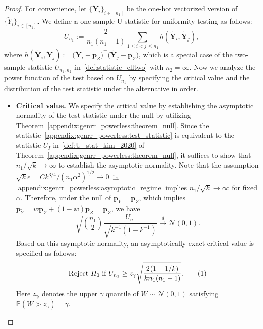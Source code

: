 \documentclass[twoside,11pt]{article}
\newcommand\numberthis{\addtocounter{equation}{1}\tag{\theequation}}
\newcommand{\rvTwo}{Y}
\newcommand{\rvThree}{Z}
\newcommand{\vectorize}[1]{\mathbf{#1}}
\newcommand{\mP}{\mathbb{P}} %
\newcommand{\sampleIndexOne}{i}
\newcommand{\sampleIndexTwo}{j}
\newcommand{\alphabetSize}{k} %
\newcommand{\sampleSize}{n}
\newcommand{\probVec}{\mathbf{p}} %
\newcommand{\privacyParameter}{\alpha} %
\begin{document}
\begin{appendix}
\begin{proof}
		For convenience, let $\{\tilde{\vectorize{\rvTwo}}_i\}_{i\in [\sampleSize_1]}$ be the one-hot vectorized version of $\{\tilde{\rvTwo}_i\}_{i\in [\sampleSize_1]}$.
		We define a one-sample U-statistic for uniformity testing as follows:
		\begin{equation}\label{appendix:genrr_powerless:test_statistic}
			U_{\sampleSize_1}
			:=	
			\frac{2}{\sampleSize_1(\sampleSize_1-1)}
			\sum_{1 \leq \sampleIndexOne < \sampleIndexTwo \leq \sampleSize_1}
			h(
			\tilde{\vectorize{\rvTwo}}_\sampleIndexOne, \tilde{\vectorize{\rvTwo}}_\sampleIndexTwo
			),
		\end{equation}
		where
		$
		h(
		\tilde{\vectorize{\rvTwo}}_\sampleIndexOne, \tilde{\vectorize{\rvTwo}}_\sampleIndexTwo
		):=
		\bigl(
		\tilde{\vectorize{\rvTwo}}_\sampleIndexOne
		- 
		\probVec_{\rvThree}
		\bigr)^\top
		\bigl(
		\tilde{\vectorize{\rvTwo}}_\sampleIndexTwo
		- 
		\probVec_{\rvThree}
		\bigr)$,
		which is a special case of the two-sample statistic $U_{\sampleSize_1, \sampleSize_2}$ in~\eqref{def:statistic_elltwo} with $\sampleSize_2 = \infty$. Now we analyze the power function of the test based on $U_{\sampleSize_1}$ by specifying the critical value and the distribution of the test statistic under the alternative in order.
		\begin{itemize}
		\item \textbf{Critical value.}
		We  specify the critical value by establishing the asymptotic normality of the test statistic under the null by utilizing Theorem~\ref{appendix:genrr_powerless:theorem_null}.
		Since the statistic~\eqref{appendix:genrr_powerless:test_statistic} is equivalent to the statistic $U_I$ in~\eqref{def:U_stat_kim_2020} of Theorem~\ref{appendix:genrr_powerless:theorem_null}, it suffices to show that $\sampleSize_1 / \sqrt{\alphabetSize} \to \infty$ to establish the asymptotic normality.
		Note that the assumption	$\sqrt{\alphabetSize} \epsilon = C
		\alphabetSize^{3/4}
		/
		(\sampleSize_1 \privacyParameter^2)^{1/2} \to 0$~in \eqref{appendix:genrr_powerless:asymptotic_regime} implies $\sampleSize_1 / \sqrt{\alphabetSize} \to \infty$ for fixed $\privacyParameter$. 
		Therefore, under the null of $\probVec_\rvTwo =\probVec_\rvThree$, which implies  $
		\probVec_{\tilde{\rvTwo}} =
		w \probVec_\rvThree + (1-w)\probVec_\rvThree = \probVec_\rvThree$, we have
		\begin{equation*}
			\sqrt{\binom{\sampleSize_1}{2}} \frac{U_{\sampleSize_1}}{\sqrt{
					\alphabetSize^{-1}  (1 - \alphabetSize^{-1})}} \overset{d}{\longrightarrow} \mathcal{N}(0, 1).   
		\end{equation*}
		\noindent
		Based on this asymptotic normality, an asymptotically exact critical value is specified as follows:
		\begin{align*}
			\text{Reject}~H_0~\text{if}~	U_{\sampleSize_1} \geq
			z_{\gamma}
			\sqrt{
				\frac{
					2(1 -  1/ \alphabetSize)}{
					\alphabetSize n_1(n_1-1)}
			}.
			\numberthis \label{appendix:genrr_powerless:critical_value}
		\end{align*}
		Here $z_{\gamma}$ denotes the upper $\gamma$ quantile of $W \sim \mathcal{N}(0,1)$ satisfying $\mP(W > z_\gamma) = \gamma$. 
		

\end{itemize}
\end{proof}
\end{appendix}
\end{document}
